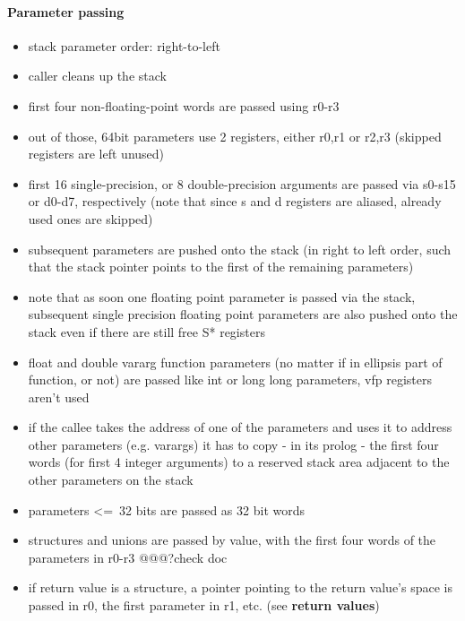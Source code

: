 \paragraph{Parameter passing}

\begin{itemize}
\item stack parameter order: right-to-left
\item caller cleans up the stack
\item first four non-floating-point words are passed using r0-r3
\item out of those, 64bit parameters use 2 registers, either r0,r1 or r2,r3 (skipped registers are left unused)
\item first 16 single-precision, or 8 double-precision arguments are passed via s0-s15 or d0-d7, respectively (note that since s and d registers are aliased, already used ones are skipped)
\item subsequent parameters are pushed onto the stack (in right to left order, such that the stack pointer points to the first of the remaining parameters)
\item note that as soon one floating point parameter is passed via the stack, subsequent single precision floating point parameters are also pushed onto the stack even if there are still free S* registers
\item float and double vararg function parameters (no matter if in ellipsis part of function, or not) are passed like int or long long parameters, vfp registers aren't used
\item if the callee takes the address of one of the parameters and uses it to address other parameters (e.g. varargs) it has to copy - in its prolog - the first four words (for first 4 integer arguments) to a reserved stack area adjacent to the other parameters on the stack
\item parameters \textless=\ 32 bits are passed as 32 bit words
\item structures and unions are passed by value, with the first four words of the parameters in r0-r3 @@@?check doc
\item if return value is a structure, a pointer pointing to the return value's space is passed in r0, the first parameter in r1, etc. (see {\bf return values})
\end{itemize}

